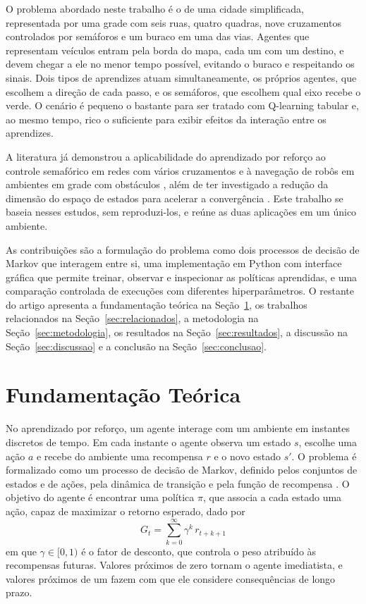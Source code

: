 \documentclass[12pt]{article}
\begin{document}
O problema abordado neste trabalho é o de uma cidade simplificada, representada por uma grade com seis ruas, quatro
quadras, nove cruzamentos controlados por semáforos e um buraco em uma das vias. Agentes que representam veículos entram
pela borda do mapa, cada um com um destino, e devem chegar a ele no menor tempo possível, evitando o buraco e respeitando
os sinais. Dois tipos de aprendizes atuam simultaneamente, os próprios agentes, que escolhem a direção de cada passo, e os
semáforos, que escolhem qual eixo recebe o verde. O cenário é pequeno o bastante para ser tratado com Q-learning tabular
e, ao mesmo tempo, rico o suficiente para exibir efeitos da interação entre os aprendizes.

A literatura já demonstrou a aplicabilidade do aprendizado por reforço ao controle semafórico em redes com vários
cruzamentos \cite{Jin2011} e à navegação de robôs em ambientes em grade com obstáculos \cite{Hafez2015}, além de ter
investigado a redução da dimensão do espaço de estados para acelerar a convergência \cite{Curran2015}. Este trabalho se
baseia nesses estudos, sem reproduzi-los, e reúne as duas aplicações em um único ambiente.

As contribuições são a formulação do problema como dois processos de decisão de Markov que interagem entre si, uma
implementação em Python com interface gráfica que permite treinar, observar e inspecionar as políticas aprendidas, e uma
comparação controlada de execuções com diferentes hiperparâmetros. O restante do artigo apresenta a fundamentação teórica
na Seção~\ref{sec:fundamentacao}, os trabalhos relacionados na Seção~\ref{sec:relacionados}, a metodologia na
Seção~\ref{sec:metodologia}, os resultados na Seção~\ref{sec:resultados}, a discussão na Seção~\ref{sec:discussao} e a
conclusão na Seção~\ref{sec:conclusao}.

\section{Fundamentação Teórica}\label{sec:fundamentacao}

No aprendizado por reforço, um agente interage com um ambiente em instantes discretos de tempo. Em cada instante o agente
observa um estado $s$, escolhe uma ação $a$ e recebe do ambiente uma recompensa $r$ e o novo estado $s'$. O problema é
formalizado como um processo de decisão de Markov, definido pelos conjuntos de estados e de ações, pela dinâmica de
transição e pela função de recompensa \cite{Sutton2018}. O objetivo do agente é encontrar uma política $\pi$, que associa
a cada estado uma ação, capaz de maximizar o retorno esperado, dado por
\begin{equation}
  G_t = \sum_{k=0}^{\infty} \gamma^{k}\, r_{t+k+1}
\end{equation}
em que $\gamma \in [0,1)$ é o fator de desconto, que controla o peso atribuído às recompensas futuras. Valores próximos de
zero tornam o agente imediatista, e valores próximos de um fazem com que ele considere consequências de longo prazo.
\end{document}
